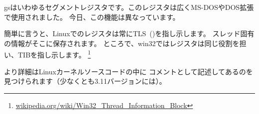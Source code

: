 gsはいわゆるセグメントレジスタです。このレジスタは広くMS-DOSやDOS拡張で使用されました。
今日、この機能は異なっています。

簡単に言うと、Linuxでのレジスタは常に\ac{TLS}~()を指し示します。
スレッド固有の情報がそこに保存されます。
ところで、win32ではレジスタは同じ役割を担い、\ac{TIB}を指し示します。
\footnote{\href{http://go.yurichev.com/17104}{wikipedia.org/wiki/Win32\_Thread\_Information\_Block}}

より詳細はLinuxカーネルソースコードの中に
コメントとして記述してあるのを見つけられます（少なくとも3.11バージョンには）。


